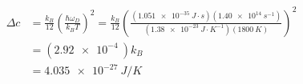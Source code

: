 \documentclass[11pt, a4paper]{article}
\begin{document}
\begin{align*}
	\Delta c &= \frac{k_B}{12}\left(\frac{\hbar \omega_D}{k_B T}\right)^2 = \frac{k_B}{12}\left(\frac{(\SI{1.051e-35}{J\cdot s}) (\SI{1.40e14}{s^{-1}})}{(\SI{1.38e-23}{J\cdot K^{-1}}) \left(\SI{1800}{K} \right)}\right)^2\\[1.0ex]
	&= \left(\SI{2.92e-4}{}\right)k_B\\[1.0ex]
	& =\boxed{ \SI{4.035e-27}{J/K}}
\end{align*}

\end{document}
